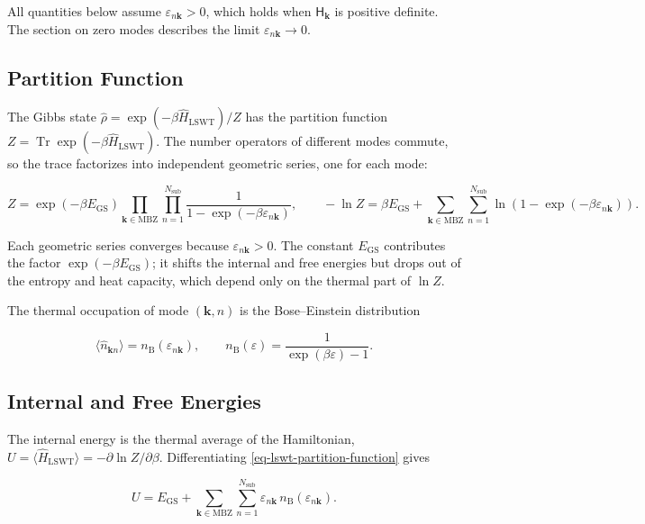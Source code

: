 All quantities below assume \(\varepsilon_{n\mathbf k}>0\), which holds when \(\mathsf H_{\mathbf k}\) is positive definite. The section on zero modes describes the limit \(\varepsilon_{n\mathbf k}\to0\).

\subsection{Partition Function}

The Gibbs state \(\hat\rho=\exp(-\beta\hat H_{\mathrm{LSWT}})/Z\) has the partition function \(Z=\operatorname{Tr}\exp(-\beta\hat H_{\mathrm{LSWT}})\). The number operators of different modes commute, so the trace factorizes into independent geometric series, one for each mode:

\begin{equation}\label{eq-lswt-partition-function}
Z=\exp(-\beta E_{\mathrm{GS}})\prod_{\mathbf k\in\mathrm{MBZ}}\prod_{n=1}^{N_{\mathrm{sub}}}\frac{1}{1-\exp(-\beta\varepsilon_{n\mathbf k})},
\qquad
-\ln Z=\beta E_{\mathrm{GS}}+\sum_{\mathbf k\in\mathrm{MBZ}}\sum_{n=1}^{N_{\mathrm{sub}}}\ln\!\left(1-\exp(-\beta\varepsilon_{n\mathbf k})\right).
\end{equation}

Each geometric series converges because \(\varepsilon_{n\mathbf k}>0\). The constant \(E_{\mathrm{GS}}\) contributes the factor \(\exp(-\beta E_{\mathrm{GS}})\); it shifts the internal and free energies but drops out of the entropy and heat capacity, which depend only on the thermal part of \(\ln Z\).

The thermal occupation of mode \((\mathbf k,n)\) is the Bose--Einstein distribution

\begin{equation}\label{eq-lswt-bose-einstein-distribution}
\langle\hat n_{\mathbf kn}\rangle
=n_{\mathrm B}(\varepsilon_{n\mathbf k}),
\qquad
n_{\mathrm B}(\varepsilon)=\frac{1}{\exp(\beta\varepsilon)-1}.
\end{equation}

\subsection{Internal and Free Energies}

The internal energy is the thermal average of the Hamiltonian, \(U=\langle\hat H_{\mathrm{LSWT}}\rangle=-\partial\ln Z/\partial\beta\). Differentiating \eqref{eq-lswt-partition-function} gives

\begin{equation}\label{eq-lswt-internal-energy}
U=E_{\mathrm{GS}}+\sum_{\mathbf k\in\mathrm{MBZ}}\sum_{n=1}^{N_{\mathrm{sub}}}\varepsilon_{n\mathbf k}\,n_{\mathrm B}(\varepsilon_{n\mathbf k}).
\end{equation}

